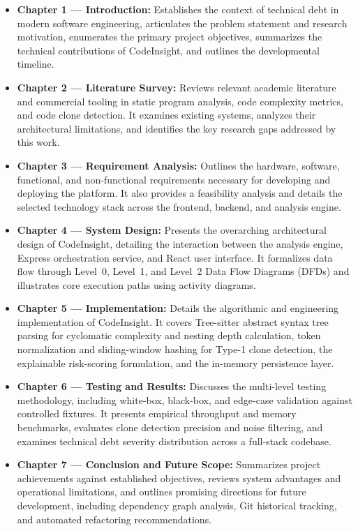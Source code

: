 \begin{itemize}\setlength{\itemsep}{3pt}\setlength{\parskip}{0pt}
    \item \textbf{Chapter 1 --- Introduction:} Establishes the context of technical debt in modern software engineering, articulates the problem statement and research motivation, enumerates the primary project objectives, summarizes the technical contributions of CodeInsight, and outlines the developmental timeline.

    \item \textbf{Chapter 2 --- Literature Survey:} Reviews relevant academic literature and commercial tooling in static program analysis, code complexity metrics, and code clone detection. It examines existing systems, analyzes their architectural limitations, and identifies the key research gaps addressed by this work.

    \item \textbf{Chapter 3 --- Requirement Analysis:} Outlines the hardware, software, functional, and non-functional requirements necessary for developing and deploying the platform. It also provides a feasibility analysis and details the selected technology stack across the frontend, backend, and analysis engine.

    \item \textbf{Chapter 4 --- System Design:} Presents the overarching architectural design of CodeInsight, detailing the interaction between the analysis engine, Express orchestration service, and React user interface. It formalizes data flow through Level~0, Level~1, and Level~2 Data Flow Diagrams (DFDs) and illustrates core execution paths using activity diagrams.

    \item \textbf{Chapter 5 --- Implementation:} Details the algorithmic and engineering implementation of CodeInsight. It covers Tree-sitter abstract syntax tree parsing for cyclomatic complexity and nesting depth calculation, token normalization and sliding-window hashing for Type-1 clone detection, the explainable risk-scoring formulation, and the in-memory persistence layer.

    \item \textbf{Chapter 6 --- Testing and Results:} Discusses the multi-level testing methodology, including white-box, black-box, and edge-case validation against controlled fixtures. It presents empirical throughput and memory benchmarks, evaluates clone detection precision and noise filtering, and examines technical debt severity distribution across a full-stack codebase.

    \item \textbf{Chapter 7 --- Conclusion and Future Scope:} Summarizes project achievements against established objectives, reviews system advantages and operational limitations, and outlines promising directions for future development, including dependency graph analysis, Git historical tracking, and automated refactoring recommendations.
\end{itemize}
